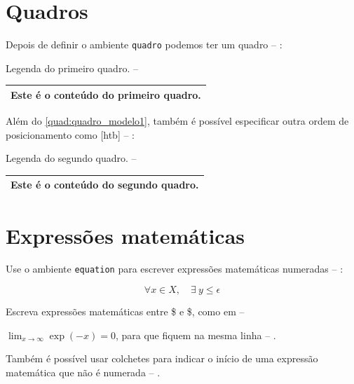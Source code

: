 \section{Quadros}

Depois de definir o ambiente \texttt{quadro} podemos ter um quadro -- \showfont:

\begin{quadro}
    \caption[Legenda do primeiro quadro.]{Legenda do primeiro quadro. -- \showfont}
    \label{quad:quadro_modelo1}
    \centering
    \begin{tabular}{|c|}
        \hline
        Este é o conteúdo do primeiro quadro. \\
        \hline
    \end{tabular}
\end{quadro}


Além do \autoref{quad:quadro_modelo1}, também é possível especificar outra ordem de posicionamento como [htb] -- \showfont:

\begin{quadro}[htb]
    \caption[Legenda do segundo quadro.]{Legenda do segundo quadro. -- \showfont}
    \label{quad:quadro_modelo2}
    \centering
    \begin{tabular}{|c|}
        \hline
        Este é o conteúdo do segundo quadro. \\
        \hline
    \end{tabular}
\end{quadro}



\section{Expressões matemáticas}

 Use o ambiente \texttt{equation} para escrever
expressões matemáticas numeradas -- \showfont:

\begin{equation}
    \forall x \in X, \quad \exists \: y \leq \epsilon
\end{equation}

Escreva expressões matemáticas entre \$ e \$, como em -- \showfont

$\lim_{x \to \infty}
    \exp(-x) = 0 $, para que fiquem na mesma linha -- \showfont.

Também é possível usar colchetes para indicar o início de uma expressão
matemática que não é numerada -- \showfont.

